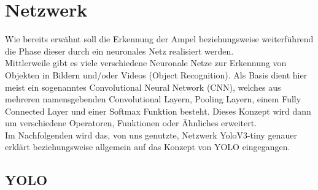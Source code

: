 \documentclass[a4paper,oneside,12pt]{report}
\begin{document}
	\chapter{Netzwerk}
	\begin{onehalfspace}
		Wie bereits erwähnt soll die Erkennung der Ampel beziehungsweise weiterführend die Phase dieser durch ein neuronales Netz realisiert werden.\\
		Mittlerweile gibt es viele verschiedene Neuronale Netze zur Erkennung von Objekten in Bildern und/oder Videos (Object Recognition). Als Basis dient hier meist ein sogenanntes Convolutional Neural Network (CNN), welches aus mehreren namensgebenden Convolutional Layern, Pooling Layern, einem Fully Connected Layer und einer Softmax Funktion besteht.
		Dieses Konzept wird dann um verschiedene Operatoren, Funktionen oder Ähnliches erweitert.\\
		Im Nachfolgenden wird das, von uns genutzte, Netzwerk YoloV3-tiny genauer erklärt beziehungsweise allgemein auf das Konzept von YOLO eingegangen.
		\section{YOLO}

\end{onehalfspace}
\end{document}
